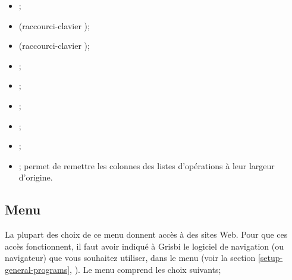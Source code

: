 \begin{itemize}
	 \item {}; 
	 \item {} (raccourci-clavier );
	 \item {} (raccourci-clavier );
	 \item {};
	 \item {};
	 \item {};
	 \item {};
	 \item {};
	 \item {}; permet de remettre les colonnes des listes d'opérations à leur largeur d'origine.
\end{itemize}


\subsection{Menu \label{home-menus-help}}

La plupart des choix de ce menu donnent accès à des sites Web. Pour que ces accès fonctionnent, il faut avoir indiqué à Grisbi le logiciel de navigation (ou navigateur) que vous souhaitez utiliser, dans le menu  (voir la section \vref{setup-general-programs}, ). Le menu  comprend les choix suivants;

